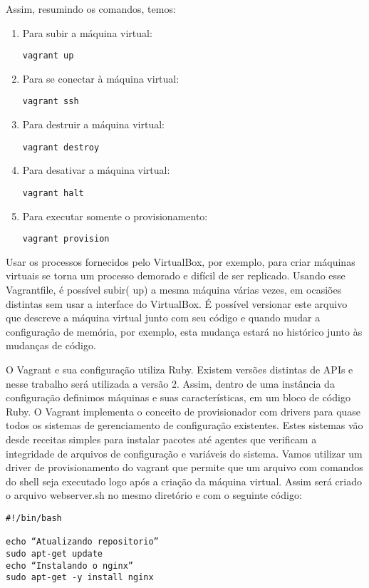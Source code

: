 Assim, resumindo os comandos, temos:
\begin{enumerate}
   \item Para subir a máquina virtual:
    \begin{lstlisting}
vagrant up
    \end{lstlisting}
   \item Para se conectar à máquina virtual:
    \begin{lstlisting}
vagrant ssh
    \end{lstlisting}   
   \item Para destruir a máquina virtual:
    \begin{lstlisting}
vagrant destroy
    \end{lstlisting}
   \item Para desativar a máquina virtual:
    \begin{lstlisting}
vagrant halt
    \end{lstlisting}    
   \item Para executar somente o provisionamento:
    \begin{lstlisting}
vagrant provision
    \end{lstlisting}
\end{enumerate}

Usar os processos fornecidos pelo VirtualBox, 
por exemplo, para criar máquinas virtuais se torna um 
processo demorado e difícil de ser replicado. Usando 
esse Vagrantfile, é possível subir( up) a mesma máquina 
várias vezes, em ocasiões distintas sem usar a 
interface do VirtualBox. É possível versionar este 
arquivo que descreve a  máquina virtual junto com seu 
código e quando mudar a configuração de memória, por 
exemplo, esta mudança estará no histórico junto às 
mudanças de código.

O Vagrant e sua configuração utiliza Ruby. Existem 
versões distintas de APIs e nesse trabalho será utilizada 
a versão 2. Assim, dentro de uma instância da configuração 
definimos máquinas e suas características, em um bloco de 
código Ruby.
O Vagrant implementa o conceito de provisionador com 
drivers para quase todos os sistemas de gerenciamento de 
configuração existentes. Estes sistemas vão desde receitas 
simples para instalar pacotes até agentes que verificam a 
integridade de arquivos de configuração e variáveis do 
sistema. Vamos utilizar um driver de provisionamento do 
vagrant que permite que um arquivo com comandos do shell 
seja executado logo após a criação da máquina virtual. 
Assim será criado o arquivo webserver.sh no mesmo diretório 
e com o seguinte código: 
\begin{lstlisting}
#!/bin/bash

echo “Atualizando repositorio”
sudo apt-get update
echo “Instalando o nginx”
sudo apt-get -y install nginx
\end{lstlisting}

